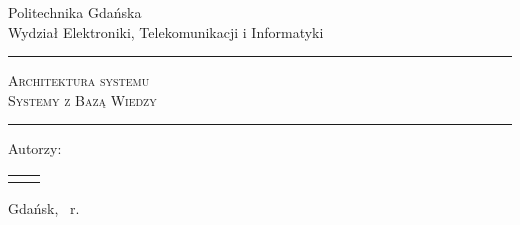 \makeatletter

\renewcommand{\maketitle}{
	\begin{titlepage}
		\begin{center}
			\small Politechnika Gdańska \\ Wydział Elektroniki, Telekomunikacji i Informatyki
		\end{center}
		\vspace{3cm}
		\noindent \rule{\linewidth}{0.4mm}
		\begin{center}
			\textsc{
				\huge{Architektura systemu } \\
				\vspace{0.3ex}
				\LARGE{Systemy z Bazą Wiedzy}
			}
			\\
			\vspace{1em}
			\Large{\@title}
		\end{center}
		\rule{\linewidth}{0.4mm}
		\vspace{1em}
		\begin{center}
			\large Autorzy: \@author
		\end{center}
		\vspace{7em}
		\ifpdf
			\begin{tabularx}{\textwidth}{ X X }
				\makebox[0.5\textwidth][l]{
					\hspace{1cm}
					\texttt{[image: logo\_pg]}
				}
				&
				\makebox[0.5\textwidth][r]{
					\texttt{[image: logo\_eti]}
					\hspace{1cm}
				}
			\end{tabularx}
		\fi
		\vspace*{\stretch{6}}
		\begin{center}
			Gdańsk, \@date \ r.
		\end{center}
	\end{titlepage}
}

\makeatother

\maketitle{}
